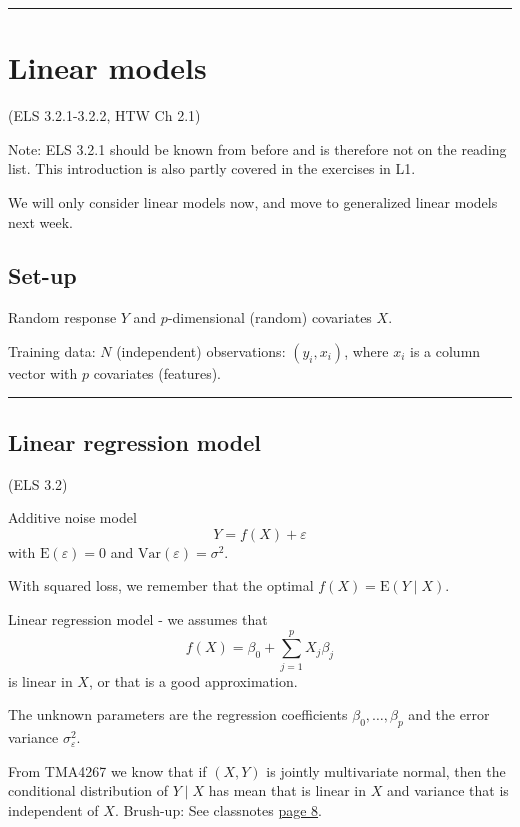 \documentclass[
  letterpaper,
  DIV=11,
  numbers=noendperiod]{scrartcl}
\begin{document}
\begin{center}\rule{0.5\linewidth}{0.5pt}\end{center}

\hypertarget{linear-models}{%
\section{Linear models}\label{linear-models}}

(ELS 3.2.1-3.2.2, HTW Ch 2.1)

Note: ELS 3.2.1 should be known from before and is therefore not on the
reading list. This introduction is also partly covered in the exercises
in L1.

We will only consider linear models now, and move to generalized linear
models next week.

\hypertarget{set-up}{%
\subsection{Set-up}\label{set-up}}

Random response \(Y\) and \(p\)-dimensional (random) covariates \(X\).

Training data: \(N\) (independent) observations: \((y_i,x_i)\), where
\(x_i\) is a column vector with \(p\) covariates (features).

\begin{center}\rule{0.5\linewidth}{0.5pt}\end{center}

\hypertarget{linear-regression-model}{%
\subsection{Linear regression model}\label{linear-regression-model}}

(ELS 3.2)

Additive noise model \[ Y=f(X)+\varepsilon\] with
\(\text{E}(\varepsilon)=0\) and \(\text{Var}(\varepsilon)=\sigma^2\).

With squared loss, we remember that the optimal
\(f(X)=\text{E}(Y \mid X)\).

Linear regression model - we assumes that
\[f(X)=\beta_0+\sum_{j=1}^p X_{j}\beta_j \] is linear in \(X\), or that
is a good approximation.

The unknown parameters are the regression coefficients
\(\beta_0,\ldots,\beta_p\) and the error variance
\(\sigma^2_{\varepsilon}\).

From TMA4267 we know that if \((X,Y)\) is jointly multivariate normal,
then the conditional distribution of \(Y\mid X\) has mean that is linear
in \(X\) and variance that is independent of \(X\). Brush-up: See
classnotes
\href{https://www.math.ntnu.no/emner/TMA4267/2017v/TMA4267V2017Part2.pdf}{page
8}.
\end{document}

